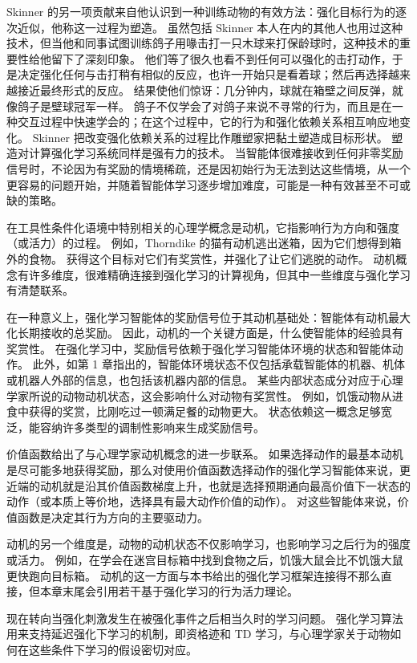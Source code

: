 \documentclass[UTF8, 12pt, fontset=fandol, oneside]{ctexart}
\begin{document}
Skinner 的另一项贡献来自他认识到一种训练动物的有效方法：强化目标行为的逐次近似，他称这一过程为塑造。
虽然包括 Skinner 本人在内的其他人也用过这种技术，但当他和同事试图训练鸽子用喙击打一只木球来打保龄球时，这种技术的重要性给他留下了深刻印象。
他们等了很久也看不到任何可以强化的击打动作，于是决定强化任何与击打稍有相似的反应，也许一开始只是看着球；然后再选择越来越接近最终形式的反应。
结果使他们惊讶：几分钟内，球就在箱壁之间反弹，就像鸽子是壁球冠军一样。
鸽子不仅学会了对鸽子来说不寻常的行为，而且是在一种交互过程中快速学会的；在这个过程中，它的行为和强化依赖关系相互响应地变化。
Skinner 把改变强化依赖关系的过程比作雕塑家把黏土塑造成目标形状。
塑造对计算强化学习系统同样是强有力的技术。
当智能体很难接收到任何非零奖励信号时，不论因为有奖励的情境稀疏，还是因初始行为无法到达这些情境，从一个更容易的问题开始，并随着智能体学习逐步增加难度，可能是一种有效甚至不可或缺的策略。

在工具性条件化语境中特别相关的心理学概念是动机，它指影响行为方向和强度（或活力）的过程。
例如，Thorndike 的猫有动机逃出迷箱，因为它们想得到箱外的食物。
获得这个目标对它们有奖赏性，并强化了让它们逃脱的动作。
动机概念有许多维度，很难精确连接到强化学习的计算视角，但其中一些维度与强化学习有清楚联系。

在一种意义上，强化学习智能体的奖励信号位于其动机基础处：智能体有动机最大化长期接收的总奖励。
因此，动机的一个关键方面是，什么使智能体的经验具有奖赏性。
在强化学习中，奖励信号依赖于强化学习智能体环境的状态和智能体动作。
此外，如第 1 章指出的，智能体环境状态不仅包括承载智能体的机器、机体或机器人外部的信息，也包括该机器内部的信息。
某些内部状态成分对应于心理学家所说的动物动机状态，这会影响什么对动物有奖赏性。
例如，饥饿动物从进食中获得的奖赏，比刚吃过一顿满足餐的动物更大。
状态依赖这一概念足够宽泛，能容纳许多类型的调制性影响来生成奖励信号。

价值函数给出了与心理学家动机概念的进一步联系。
如果选择动作的最基本动机是尽可能多地获得奖励，那么对使用价值函数选择动作的强化学习智能体来说，更近端的动机就是沿其价值函数梯度上升，也就是选择预期通向最高价值下一状态的动作（或本质上等价地，选择具有最大动作价值的动作）。
对这些智能体来说，价值函数是决定其行为方向的主要驱动力。

动机的另一个维度是，动物的动机状态不仅影响学习，也影响学习之后行为的强度或活力。
例如，在学会在迷宫目标箱中找到食物之后，饥饿大鼠会比不饥饿大鼠更快跑向目标箱。
动机的这一方面与本书给出的强化学习框架连接得不那么直接，但本章末尾会引用若干基于强化学习的行为活力理论。

现在转向当强化刺激发生在被强化事件之后相当久时的学习问题。
强化学习算法用来支持延迟强化下学习的机制，即资格迹和 TD 学习，与心理学家关于动物如何在这些条件下学习的假设密切对应。
\end{document}

